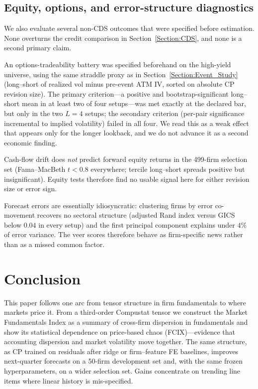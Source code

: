 \documentclass[pdflatex,sn-mathphys-num]{sn-jnl}%
\theoremstyle{thmstyleone}%
\theoremstyle{thmstyletwo}%
\theoremstyle{thmstylethree}%
\begin{document}
\subsection{Equity, options, and error-structure diagnostics}
\label{Section:Closed_Routes}

We also evaluate several non-CDS outcomes that were specified before estimation. None overturns the credit comparison in Section~\ref{Section:CDS}, and none is a second primary claim.

An options-tradeability battery was specified beforehand on the high-yield universe, using the same straddle proxy as in Section~\ref{Section:Event_Study} (long--short of realized vol minus pre-event ATM IV, sorted on absolute CP revision size). The primary criterion---a positive and bootstrap-significant long--short mean in at least two of four setups---was met exactly at the declared bar, but only in the two $L=4$ setups; the secondary criterion (per-pair significance incremental to implied volatility) failed in all four. We read this as a weak effect that appears only for the longer lookback, and we do not advance it as a second economic finding.

Cash-flow drift does \emph{not} predict forward equity returns in the 499-firm selection set (Fama--MacBeth $t < 0.8$ everywhere; tercile long--short spreads positive but insignificant). Equity tests therefore find no usable signal here for either revision size or error sign.

Forecast errors are essentially idiosyncratic: clustering firms by error co-movement recovers no sectoral structure (adjusted Rand index versus GICS below $0.04$ in every setup) and the first principal component explains under $4\%$ of error variance. The veer scores therefore behave as firm-specific news rather than as a missed common factor.

\FloatBarrier
\section{Conclusion}

This paper follows one arc from tensor structure in firm fundamentals to where markets price it. From a third-order Compustat tensor we construct the Market Fundamentals Index as a summary of cross-firm dispersion in fundamentals and show its statistical dependence on price-based chaos (FCIX)---evidence that accounting dispersion and market volatility move together. The same structure, as CP trained on residuals after ridge or firm--feature FE baselines, improves next-quarter forecasts on a 50-firm development set and, with the same frozen hyperparameters, on a wider selection set. Gains concentrate on trending line items where linear history is mis-specified.
\end{document}

